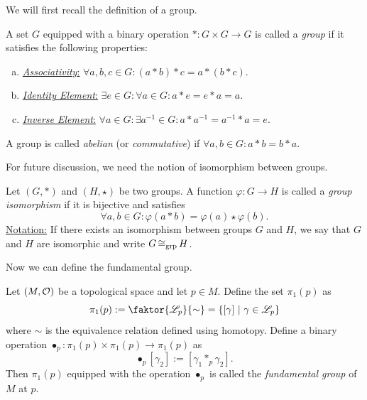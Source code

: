 We will first recall the definition of a group.
\begin{definition}[Group]\label{def:group}
	A set \(G\) equipped with a binary operation \(\ast: G \times G \to G\) is called a \emph{group} if it satisfies the following properties:
	\begin{enumerate}[(a)]
		\item \uline{\emph{Associativity}:} \(\forall a, b, c \in G: (a \ast b) \ast c = a \ast (b \ast c)\).
		\item \uline{\emph{Identity Element}:} \(\exists e \in G: \forall a \in G: a \ast e = e \ast a = a\).
		\item \uline{\emph{Inverse Element}:} \(\forall a \in G: \exists a^{-1} \in G: a \ast a^{-1} = a^{-1} \ast a = e\).
	\end{enumerate}
	A group is called \emph{abelian} (or \emph{commutative}) if \(\forall a, b \in G: a \ast b = b \ast a\).
\end{definition}
For future discussion, we need the notion of isomorphism between groups.
\begin{definition}\label{def:group_isomorphism}
	Let \((G, \ast)\) and \((H, \star)\) be two groups. A function \(\varphi: G \to H\) is called a \emph{group isomorphism} if it is bijective and satisfies
	\begin{equation}
		\forall a, b \in G: \varphi(a \ast b) = \varphi(a) \star \varphi(b). \label{eq:group_isomorphism}
	\end{equation}
	\uline{Notation:} If there exists an isomorphism between groups \(G\) and \(H\), we say that \(G\) and \(H\) are isomorphic and write \(G \operatorname{\mathrel{\cong_{\text{grp}}}} H\).
\end{definition}

Now we can define the fundamental group.
\begin{definition}\label{def:fundamental_group}
	Let \((M, \mathcal{O})\) be a topological space and let \(p \in M\). Define the set \(\pi_1(p)\) as
	\begin{equation}
		\pi_1(p) := \faktor{\mathscr{L}_p}{\sim} = \qty{[\gamma] \mid \gamma \in \mathscr{L}_p} \label{eq:fundamental_group_set}
	\end{equation}
	where \(\sim\) is the equivalence relation defined using homotopy. Define a binary operation \(\bullet_p: \pi_1(p) \times \pi_1(p) \to \pi_1(p)\) as
	\begin{equation}
		[\gamma_1] \bullet_p [\gamma_2] := [\gamma_1 \ast_p \gamma_2]. \label{eq:fundamental_group_operation}
	\end{equation}
	Then \(\pi_1(p)\) equipped with the operation \(\bullet_p\) is called the \emph{fundamental group} of \(M\) at \(p\).
\end{definition}

